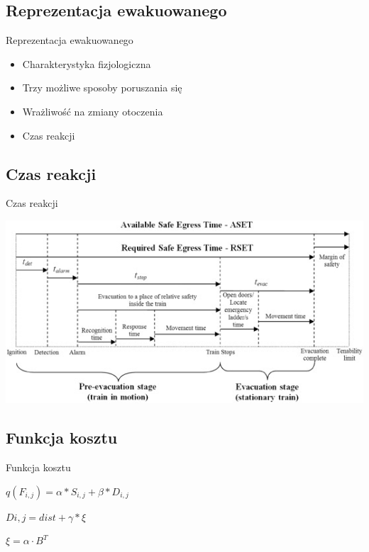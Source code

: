 \subsection{Reprezentacja ewakuowanego}
\begin{frame}{Reprezentacja ewakuowanego}
\begin{itemize}
	\item Charakterystyka fizjologiczna
	\item Trzy możliwe sposoby poruszania się
	\item Wrażliwość na zmiany otoczenia
	\item Czas reakcji
\end{itemize}
\end{frame}

\subsection{Czas reakcji}
\begin{frame}{Czas reakcji}
\begin{center}	
	\includegraphics[]{egress_time}
\end{center}
\end{frame}

\subsection{Funkcja kosztu}
\begin{frame}{Funkcja kosztu}
\begin{center}
$q(F_{i,j}) = \alpha * S_{i,j} + \beta * D_{i,j}$
\end{center}

\begin{center}
$D{i,j} = dist + \gamma * \xi$
\end{center}

\begin{center}
$\xi = \alpha \cdot B^T$
\end{center}
\end{frame}